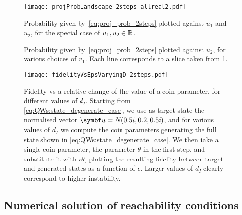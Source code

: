\begin{figure}[tb]
	\centering
	\texttt{[image: projProbLandscape\_2steps\_allreal2.pdf]}
	\caption{
		Probability given by~\cref{eq:proj_prob_2steps} plotted against $u_1$ and $u_2$, for the special case of $u_1, u_2 \in {\mathbb{R}}$.
	}
	\label{fig:proj_prob_landscape_plot3d}
\end{figure}
\begin{figure}[tb]
	\centering
	\caption{
		Probability given by~\cref{eq:proj_prob_2steps} plotted against $u_2$, for various choices of $u_1$.
		Each line corresponds to a slice taken from \cref{fig:proj_prob_landscape_plot3d}.}
	\label{fig:proj_prob_landscape_slices}
\end{figure}
\begin{figure}[tb]
	\centering
	\texttt{[image: fidelityVsEpsVaryingD\_2steps.pdf]}
	\caption{
		Fidelity vs a relative change of the value of a coin parameter, for different values of $d_I$.
		Starting from \cref{eq:QWs:state_degenerate_case}, we use as target state the normalised vector
		$\bs u = N (0.5 i, 0.2, 0.5 i)$, and for various values of $d_I$ we compute the coin parameters generating the full state shown in \cref{eq:QWs:state_degenerate_case}.
		We then take a single coin parameter, the parameter $\theta$ in the first step, and substitute it with $\epsilon \theta$, plotting the resulting fidelity between target and generated states as a function of $\epsilon$.
		Larger values of $d_I$ clearly correspond to higher instability.
	}
	\label{fig:fid_vs_eps_varying_d}
\end{figure}

\subsection{Numerical solution of reachability conditions}
\label{sec:QWs:numerical_solution_reachability_conditions}

